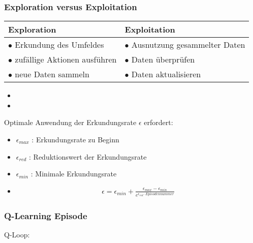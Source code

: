 \documentclass{beamer}
\begin{document}
\begin{frame}%
\frametitle{Exploration versus Exploitation}
\begin{tabular}{l|l}
Exploration & Exploitation\\
\hline
$\bullet$ Erkundung des Umfeldes & $\bullet$ Ausnutzung gesammelter Daten\\
$\bullet$ zufällige Aktionen ausführen & $\bullet$ Daten überprüfen\\
$\bullet$ neue Daten sammeln & $\bullet$ Daten aktualisieren
\end{tabular}
\begin{itemize}
\item[]
\item[]
\end{itemize}
Optimale Anwendung der Erkundungsrate $\epsilon$ erfordert:
\begin{itemize}
\item $\epsilon_{max}$ : Erkundungsrate zu Beginn\\
\item $\epsilon_{red}$ : Reduktionswert der Erkundungsrate\\
\item $\epsilon_{min}$ : Minimale Erkundungsrate\\
\item[] \begin{align*}
\epsilon = \epsilon_{min} + \frac{\epsilon_{max} - \epsilon_{min}}{e^{\epsilon_{red} \cdot Episodennummer}} \nonumber
\end{align*}
\end{itemize}
\end{frame}

\begin{frame}
\frametitle{Q-Learning Episode}
\begin{center}
\end{center}
Q-Loop:
\begin{center}
\end{center}
\end{frame}
\end{document}
